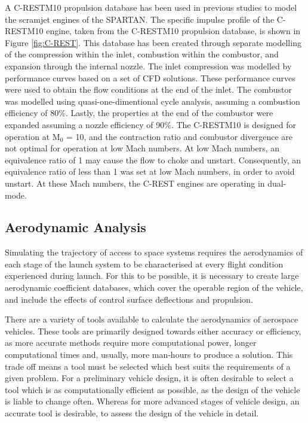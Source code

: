 A C-RESTM10 propulsion database has been used in previous studies to model the scramjet engines of the SPARTAN\cite{Preller2017b}. The specific impulse profile of the C-RESTM10 engine, taken from the C-RESTM10 propulsion database, is shown in Figure \ref{fig:C-REST}. This database has been created through separate modelling of the compression within the inlet, combustion within the combustor, and expansion through the internal nozzle\cite{Preller2018a}. The inlet compression was modelled by performance curves based on a set of CFD solutions\cite{Preller2018a}. These performance curves were used to obtain the flow conditions at the end of the inlet. The combustor was modelled using quasi-one-dimentional cycle analysis, assuming a combustion efficiency of 80\%\cite{Preller2018a}. Lastly, the properties at the end of the combustor were expanded assuming a nozzle efficiency of 90\%\cite{Preller2018a}.
The C-RESTM10 is designed for operation at M$_0$ = 10, and the contraction ratio and combustor divergence are not optimal for operation at low Mach numbers. At low Mach numbers, an equivalence ratio of 1 may cause the flow to choke and unstart. 
Consequently, an equivalence ratio of less than 1 was set at low Mach numbers, in order to avoid unstart\cite{Preller2018a}. At these Mach numbers, the C-REST engines are operating in dual-mode\cite{Preller2018a}. 





\subsection{Aerodynamic Analysis}


Simulating the trajectory of access to space systems requires the aerodynamics of each stage of the launch system to be characterised at every flight condition experienced during launch. For this to be possible, it is necessary to create large aerodynamic coefficient databases, which cover the operable region of the vehicle, and include the effects of control surface deflections and propulsion.

There are a variety of tools available to calculate the aerodynamics of aerospace vehicles.
 These tools are primarily designed towards either accuracy or efficiency, as more accurate methods require more computational power, longer computational times and, usually, more man-hours to produce a solution. 
This trade off means a tool must be selected which best suits the requirements of a given problem. 
For a preliminary vehicle design, it is often desirable to select a tool which is as computationally efficient as possible, as the design of the vehicle is liable to change often. 
Whereas for more advanced stages of vehicle design, an accurate tool is desirable, to assess the design of the vehicle in detail. 

